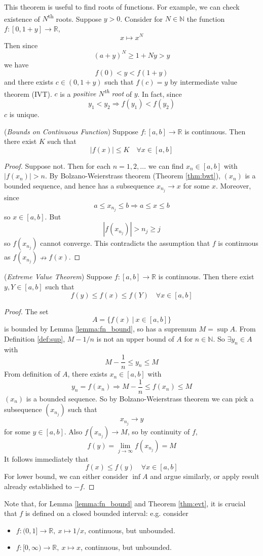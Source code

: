 \documentclass[10pt, a4paper, twoside]{report}
\begin{document}
This theorem is useful to find roots of functions. For example, we can check existence of \(N\){\textsuperscript{th}} roots. Suppose \(y>0\). Consider for \(N\in\mathbb{N}\) the function \(f:[0,1+y]\to\mathbb{R}\),
\[x\mapsto x^N\]
Then since
\[(a+y)^N\geq 1+Ny>y\]
we have 
\[f(0)<y<f(1+y)\]
and there exists \(c\in(0,1+y)\) such that \(f(c)=y\) by intermediate value theorem (IVT). \(c\) is a \emph{positive \(N\)\textsuperscript{th} root} of \(y\). In fact, since
\[y_1<y_2\Rightarrow f(y_1)<f(y_2)\]
\(c\) is unique.
\begin{lemma}
    (\emph{Bounds on Continuous Function}) Suppose \(f:[a,b]\to\mathbb{R}\) is continuous. Then there exist \(K\) such that
    \[|f(x)|\leq K\quad\forall x\in[a,b]\]
    \label{lemma:fn_bound}
\end{lemma}
\begin{proof}
    Suppose not. Then for each \(n=1,2,\ldots\) we can find \(x_n\in[a,b]\) with \(|f(x_n)|>n\). By Bolzano-Weierstrass theorem (Theorem \ref{thm:bwt}), \((x_n)\) is a bounded sequence, and hence has a subsequence \(x_{n_j}\to x\) for some \(x\). Moreover, since
    \[a\leq x_{n_j}\leq b\Rightarrow a\leq x\leq b\]
    so \(x\in[a,b]\). But 
    \[|f(x_{n_j})|>n_j\geq j\]
    so \(f(x_{n_j})\) cannot converge. This contradicts the assumption that \(f\) is continuous as \(f(x_{n_j})\nrightarrow f(x)\).
\end{proof}
\begin{theorem}
    (\emph{Extreme Value Theorem}) Suppose \(f:[a,b]\to\mathbb{R}\) is continuous. Then there exist \(y,Y\in[a,b]\) such that
    \[f(y)\leq f(x)\leq f(Y)\quad\forall x\in[a,b]\]
    \label{thm:evt}
\end{theorem}
\begin{proof}
    The set 
    \[A=\{f(x)\:|\:x\in[a,b]\}\]
    is bounded by Lemma \ref{lemma:fn_bound}, so has a supremum \(M=\sup A\). From Definition \ref{def:sup}, \(M-1/n\) is not an upper bound of \(A\) for \(n\in\mathbb{N}\). So \(\exists y_n\in A\) with 
    \[M-\frac 1n\leq y_n\leq M\]
    From definition of \(A\), there exists \(x_n\in[a,b]\) with
    \[y_n=f(x_n)\Rightarrow M-\frac 1n\leq f(x_n)\leq M\]
    \((x_n)\) is a bounded sequence. So by Bolzano-Weierstrass theorem we can pick a subsequence \((x_{n_j})\) such that \[x_{n_j}\to y\] for some \(y\in[a,b]\). Also \(f(x_{n_j})\to M\), so by continuity of \(f\),
    \[f(y)=\lim_{j\to\infty}f(x_{n_j})=M\]
    It follows immediately that
    \[f(x)\leq f(y)\quad\forall x\in[a,b]\]
    For lower bound, we can either consider \(\inf A\) and argue similarly, or apply result already established to \(-f\).
\end{proof}
Note that, for Lemma \ref{lemma:fn_bound} and Theorem \ref{thm:evt}, it is crucial that \(f\) is defined on a closed bounded interval: e.g. consider 
\begin{itemize}
    \item \(f:(0,1]\to\mathbb{R},\:x\mapsto 1/x\), continuous, but unbounded.
    \item \(f:[0,\infty)\to\mathbb{R},\:x\mapsto x\), continuous, but unbounded.
\end{itemize}
\end{document}
